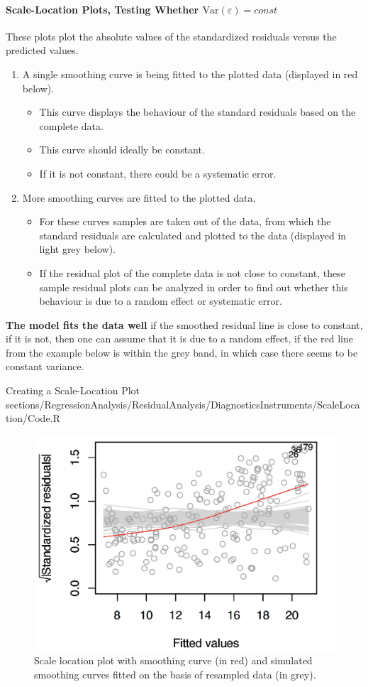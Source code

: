 \paragraph{Scale-Location Plots, Testing Whether $\mathrm{Var}(\varepsilon) = const$}
	These plots plot the absolute values of the standardized residuals versus the predicted values. 
	
	\begin{enumerate}
	  	\item A single smoothing curve is being fitted to the plotted data (displayed in red below).  
	  		\begin{itemize}
	  		  \item This curve displays the behaviour of the standard residuals based on the complete data.
	  		  \item This curve should ideally be constant.
	  		  \item If it is not constant, there could be a systematic error.
	  		\end{itemize}
	  	\item More smoothing curves are fitted to the plotted data. 
	  		\begin{itemize}
	  		  \item For these curves samples are taken out of the data, from which the standard residuals are calculated and plotted to the data (displayed in light grey below).
	  		  \item If the residual plot of the complete data is not close to constant, these sample residual plots can be analyzed in order to find out whether this behaviour is due to a random effect or systematic error.
	  		\end{itemize}
	  	\end{enumerate}	
	
	\textbf{The model fits the data well} if the smoothed residual line is close to constant, if it is not, then one can assume that it is due to a random effect, if the red line from the example below is within the grey band, in which case there seems to be constant variance.
	
	\RCode
	{
		Creating a Scale-Location Plot
	}
	{
		sections/RegressionAnalysis/ResidualAnalysis/DiagnosticsInstruments/ScaleLocation/Code.R
	}
	
	\begin{figure}[H]\centering
		\includegraphics[width=0.3\linewidth]{images/ScaleLocation.png}
		\caption{Scale location plot with smoothing curve (in red) and simulated smoothing curves fitted on the basis of resampled data (in grey).}
	\end{figure}